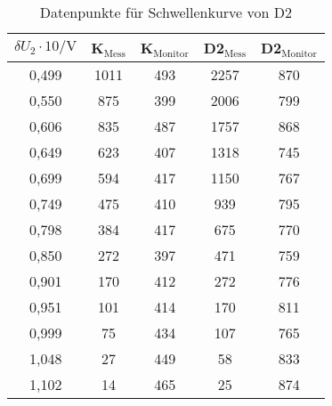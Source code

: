 \begin{table}[h]
    \centering
    \small
    \caption{Datenpunkte für Schwellenkurve von D2}
    \label{tab:schwelle_d2}
    \begin{tabular}{c c c c c}
      \toprule
      $\delta U_2 \cdot 10/\si{\volt}$ & K$_\mathrm{Mess}$ & K$_\mathrm{Monitor}$ & D2$_\mathrm{Mess}$ & D2$_\mathrm{Monitor}$ \\
      \midrule
      0,499      &     1011  &  493  &   2257  &  870\\
      0,550      &     875   &  399  &   2006  &  799\\
      0,606      &     835   &  487  &   1757  &  868\\
      0,649      &     623   &  407  &   1318  &  745\\
      0,699      &     594   &  417  &   1150  &  767\\
      0,749      &     475   &  410  &   939   &  795\\
      0,798      &     384   &  417  &   675   &  770\\
      0,850      &     272   &  397  &   471   &  759\\
      0,901      &     170   &  412  &   272   &  776\\
      0,951      &     101   &  414  &   170   &  811\\
      0,999      &     75    &  434  &   107   &  765\\
      1,048      &     27    &  449  &   58    &  833\\
      1,102      &     14    &  465  &   25    &  874\\
      \bottomrule
    \end{tabular}
  \end{table}
